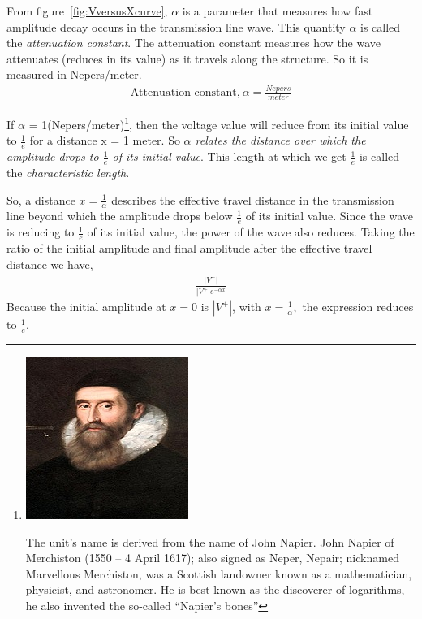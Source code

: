 From figure~\ref{fig:VversusXcurve}, $\alpha$ is a parameter that measures how fast amplitude decay occurs in the transmission line wave. This quantity $\alpha$ is called the \emph{attenuation constant}. The attenuation constant measures how the wave attenuates (reduces in its value) as it travels along the structure. So it is measured in Nepers/meter.
\begin{align*}
\text{Attenuation constant,}\ \alpha = \frac{Nepers}{meter}
\end{align*}

If $\alpha$ = 1(Nepers/meter)\footnote{
\includegraphics[scale=0.2]{graphics/johnnapier2}

The unit's name is derived from the name of John Napier. John Napier of Merchiston (1550 – 4 April 1617); also signed as Neper, Nepair; nicknamed Marvellous Merchiston, was a Scottish landowner known as a mathematician, physicist, and astronomer. He is best known as the discoverer of logarithms, he also invented the so-called \textquotedblleft Napier's bones\textquotedblright
}, then the voltage value will reduce from its initial value to $\frac{1}{e}$ for a distance x = 1 meter. So \emph{$\alpha$ relates the distance over which the amplitude drops to $\frac{1}{e}$ of its initial value}. This length at which we get $\frac{1}{e}$ is called the \emph{characteristic length}. 

So, a distance $x = \frac{1}{\alpha}$ describes the effective travel distance in the transmission line beyond which the amplitude drops below $\frac{1}{e}$ of its initial value. Since the wave is reducing to $\frac{1}{e}$ of its initial value, the power of the wave also reduces. Taking the ratio of the initial amplitude and final amplitude after the effective travel distance we have,
\begin{align*}
\frac{\lvert V^+\rvert}{\lvert V^+\rvert e ^{-\alpha x}}
\end{align*}
Because the initial amplitude at $x = 0$ is $\left| V^+\right|$, with $x = \frac{1}{\alpha},$ the expression reduces to $\frac{1}{e}$.

